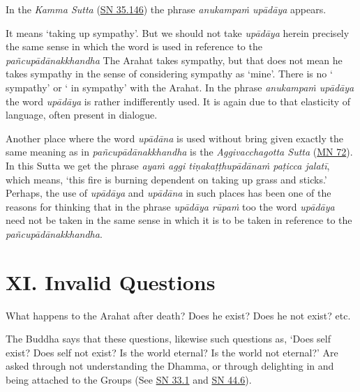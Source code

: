 In the \emph{Kamma Sutta} (\href{https://suttacentral.net/sn35.146/en/bodhi}{SN 35.146}) the phrase \emph{anukampaṁ upādāya} appears.

It means `taking up sympathy'. But we should not take \emph{upādāya} herein precisely the same sense in which the word is used in reference to the \emph{pañcupādānakkhandha} The Arahat takes sympathy, but that does not mean he takes sympathy in the sense of considering sympathy as `mine'. There is no ` sympathy' or ` in sympathy' with the Arahat. In the phrase \emph{anukampaṁ upādāya} the word \emph{upādāya} is rather indifferently used. It is again due to that elasticity of language, often present in dialogue.

Another place where the word \emph{upādāna} is used without bring given exactly the same meaning as in \emph{pañcupādānakkhandha} is the \emph{Aggivacchagotta Sutta} (\href{https://suttacentral.net/mn72/en/thanissaro}{MN 72}). In this Sutta we get the phrase \emph{ayaṁ aggi tiṇakaṭṭhupādānaṁ paṭicca jalatī}, which means, `this fire is burning dependent on taking up grass and sticks.' Perhaps, the use of \emph{upādāya} and \emph{upādāna} in such places has been one of the reasons for thinking that in the phrase \emph{upādāya rūpaṁ} too the word \emph{upādāya} need not be taken in the same sense in which it is to be taken in reference to the \emph{pañcupādānakkhandha}.

\hypertarget{_xi_invalid_questions}{%
\section{XI. Invalid Questions}\label{_xi_invalid_questions}}

What happens to the Arahat after death? Does he exist? Does he not exist? etc.

The Buddha says that these questions, likewise such questions as, `Does self exist? Does self not exist? Is the world eternal? Is the world not eternal?' Are asked through not understanding the Dhamma, or through delighting in and being attached to the Groups (See \href{https://suttacentral.net/sn33.1/en/sujato}{SN 33.1} and \href{https://suttacentral.net/sn44.6/en/bodhi}{SN 44.6}).

